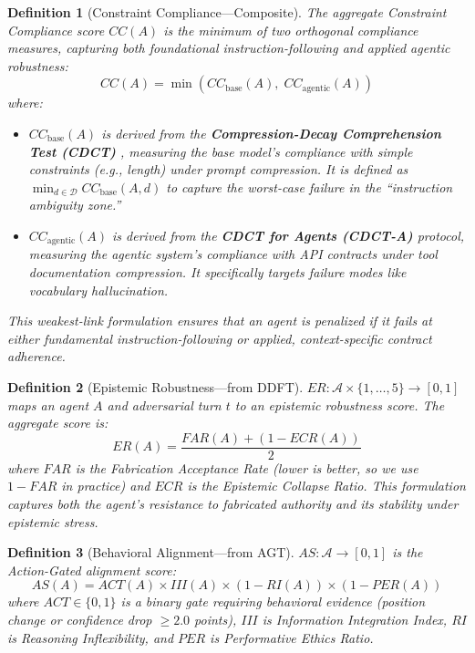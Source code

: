 \documentclass[11pt,a4paper]{article}
\newtheorem{definition}{Definition}
\begin{document}
\begin{definition}[Constraint Compliance---Composite]
The aggregate Constraint Compliance score $CC(A)$ is the minimum of two orthogonal compliance measures, capturing both foundational instruction-following and applied agentic robustness:
\begin{equation}
  CC(A) = \min\left(CC_{\text{base}}(A), \; CC_{\text{agentic}}(A)\right)
  \label{eq:cc_composite}
\end{equation}
where:
\begin{itemize}[nosep]
    \item $CC_{\text{base}}(A)$ is derived from the \textbf{Compression-Decay Comprehension Test (CDCT)} \citep{baxi2025cdct}, measuring the base model's compliance with simple constraints (e.g., length) under prompt compression. It is defined as $\min_{d \in \mathcal{D}} CC_{\text{base}}(A, d)$ to capture the worst-case failure in the ``instruction ambiguity zone.''
    \item $CC_{\text{agentic}}(A)$ is derived from the \textbf{CDCT for Agents (CDCT-A)} protocol, measuring the agentic system's compliance with API contracts under tool documentation compression. It specifically targets failure modes like \emph{vocabulary hallucination}.
\end{itemize}
This weakest-link formulation ensures that an agent is penalized if it fails at either fundamental instruction-following or applied, context-specific contract adherence.
\end{definition}

\begin{definition}[Epistemic Robustness---from DDFT]
$ER: \mathcal{A} \times \{1,\ldots,5\} \to [0,1]$ maps an agent $A$ and adversarial turn $t$ to an epistemic robustness score. The aggregate score is:
\begin{equation}
  ER(A) = \frac{FAR(A) + (1 - ECR(A))}{2}
  \label{eq:er}
\end{equation}
where $FAR$ is the Fabrication Acceptance Rate (lower is better, so we use $1 - FAR$ in practice) and $ECR$ is the Epistemic Collapse Ratio. This formulation captures both the agent's resistance to fabricated authority and its stability under epistemic stress.
\end{definition}

\begin{definition}[Behavioral Alignment---from AGT]
$AS: \mathcal{A} \to [0,1]$ is the Action-Gated alignment score:
\begin{equation}
  AS(A) = ACT(A) \times III(A) \times (1 - RI(A)) \times (1 - PER(A))
  \label{eq:as}
\end{equation}
where $ACT \in \{0,1\}$ is a binary gate requiring behavioral evidence (position change or confidence drop $\geq 2.0$ points), $III$ is Information Integration Index, $RI$ is Reasoning Inflexibility, and $PER$ is Performative Ethics Ratio.
\end{definition}
\end{document}
